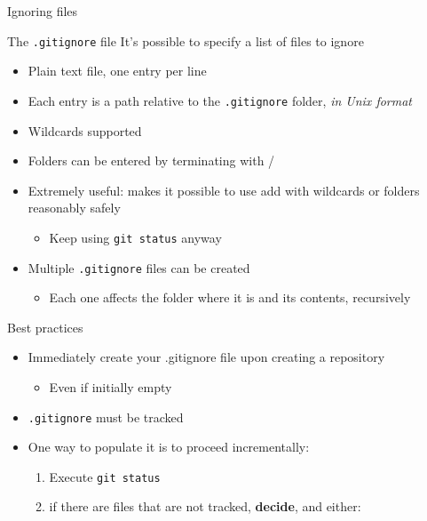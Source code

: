 \documentclass[presentation]{beamer}
\begin{document}
\begin{frame}[allowframebreaks]{Ignoring files}
    \begin{block}{The \texttt{.gitignore} file}
        It's possible to specify a list of files to ignore
        \begin{itemize}
            \item Plain text file, one entry per line
            \item Each entry is a path relative to the \texttt{.gitignore} folder, \emph{in Unix format}
            \item Wildcards supported
            \item Folders can be entered by terminating with /
            \item Extremely useful: makes it possible to use add with wildcards or folders reasonably safely
            \begin{itemize}
                \item Keep using \texttt{git status} anyway
            \end{itemize}
            \item Multiple \texttt{.gitignore} files can be created 
            \begin{itemize}
                \item Each one affects the folder where it is and its contents, recursively
            \end{itemize}
        \end{itemize}
    \end{block}
    \begin{block}{Best practices}
        \begin{itemize}
            \item Immediately create your .gitignore file upon creating a repository
            \begin{itemize}
                \item Even if initially empty
            \end{itemize}
            \item \texttt{.gitignore} must be tracked
            \item One way to populate it is to proceed incrementally:
            \begin{enumerate}
                \item Execute \texttt{git status}
                \item if there are files that are not tracked, \textbf{decide}, and either:
                \begin{itemize}

\end{itemize}
\end{enumerate}
\end{itemize}
\end{block}
\end{frame}
\end{document}
